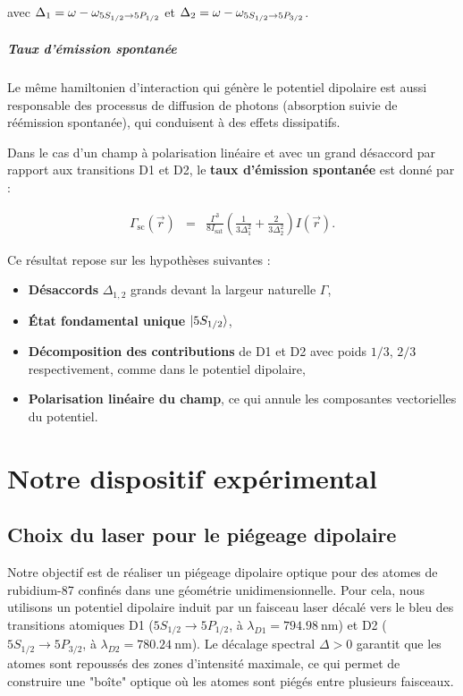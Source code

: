 avec $\Delta_1 = \omega -\omega_{\scriptstyle \tiny 5S_{1/2} \rightarrow 5P_{1/2}} $ et $\Delta_2 = \omega -\omega_{\scriptstyle \tiny 5S_{1/2} \rightarrow 5P_{3/2}} $.

\subparagraph{Taux d’émission spontanée}
Le même hamiltonien d’interaction qui génère le potentiel dipolaire est aussi responsable des processus de diffusion de photons (absorption suivie de réémission spontanée), qui conduisent à des effets dissipatifs.

Dans le cas d’un champ à polarisation linéaire et avec un grand désaccord par rapport aux transitions D1 et D2, le {\bf taux d’émission spontanée} est donné par :

\begin{eqnarray}
\Gamma_{\mathrm{sc}}(\vec{r}) & = & \frac{\Gamma^3}{8 I_{\mathrm{sat}}} \left( \frac{1}{3 \Delta_1^2} + \frac{2}{3 \Delta_2^2} \right) I(\vec{r}) .
\label{eq:scattering_rate}
\end{eqnarray}

Ce résultat repose sur les hypothèses suivantes :
\begin{itemize}[label = $\bullet$]
	\item {\bf Désaccords} $\Delta_{1,2}$  grands devant la largeur naturelle $\Gamma$,
	\item {\bf État fondamental unique} $\ket{5S_{1/2}}$,
	\item {\bf Décomposition des contributions} de D1 et D2 avec poids $1/3$, $2/3$ respectivement, comme dans le potentiel dipolaire,
	\item {\bf Polarisation linéaire du champ}, ce qui annule les composantes vectorielles du potentiel.
\end{itemize}






\section{Notre dispositif expérimental}

\subsection{Choix du laser pour le piégeage dipolaire}

Notre objectif est de réaliser un piégeage dipolaire optique pour des atomes de rubidium-87 confinés dans une géométrie unidimensionnelle. Pour cela, nous utilisons un potentiel dipolaire induit par un faisceau laser décalé vers le bleu des transitions atomiques D1 ($5S_{1/2} \rightarrow 5P_{1/2}$, à $\lambda_{D1} = 794.98~\text{nm}$) et D2 ($5S_{1/2} \rightarrow 5P_{3/2}$, à $\lambda_{D2} = 780.24~\text{nm}$). Le décalage spectral $\Delta > 0$ garantit que les atomes sont repoussés des zones d’intensité maximale, ce qui permet de construire une "boîte" optique où les atomes sont piégés entre plusieurs faisceaux.

